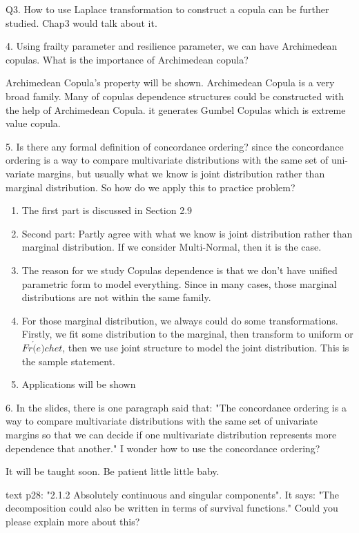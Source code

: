 \documentclass[a4paper,12pt]{texMemo}
\begin{document}
Q3. How to use Laplace transformation to construct a copula can be further studied. Chap3 would talk about it.

4. Using frailty parameter and resilience parameter, we can have Archimedean copulas. What is the importance of Archimedean copula?

Archimedean Copula's property will be shown. Archimedean Copula is a very broad family. Many of copulas dependence structures could be constructed with the help of Archimedean Copula. it generates Gumbel Copulas which is extreme value copula.

5. Is there any formal definition of concordance ordering? since the concordance ordering is a way to compare multivariate distributions with the same set of uni-variate margins, but usually what we know is joint distribution rather than marginal distribution. So how do we apply this to practice problem?

\begin{enumerate}
\item The first part is discussed in Section 2.9
\item Second part: Partly agree with what we know is joint distribution rather than marginal distribution. If we consider Multi-Normal, then it is the case. 
\item The reason for we study Copulas dependence is that we don't have unified parametric form to model everything. Since in many cases, those marginal distributions are not within the same family. 
\item For those marginal distribution, we always could do some transformations. Firstly, we fit some distribution to the marginal, then transform to uniform or $Fr\acute(e)chet$, then we use joint structure to model the joint distribution. This is the sample statement.
\item Applications will be shown
\end{enumerate}

6. In the slides, there is one paragraph said that: 
"The concordance ordering is a way to compare multivariate distributions with the same set of univariate margins so that we can decide if one multivariate distribution represents more dependence that another."
I wonder how to use the concordance ordering?

It will be taught soon. Be patient little little baby.

text p28: "2.1.2 Absolutely continuous and singular components". It says: "The decomposition could also be written in terms of survival functions." Could you please explain more about this?
\end{document}

